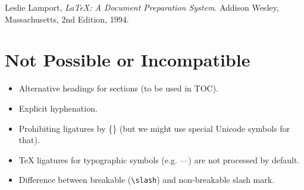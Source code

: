 \documentclass[10pt]{article}
\begin{document}



\begin{thebibliography}{9}

 Leslie Lamport, \emph{\LaTeX: A Document Preparation System}.
Addison Wesley, Massachusetts, 2nd Edition, 1994.

\end{thebibliography}

\hrulefill

\section{Not Possible or Incompatible}

\begin{itemize}

\item Alternative headings for sections (to be used in TOC).

\item Explicit hyphenation.

\item Prohibiting ligatures by \{\} (but we might use special Unicode symbols
for that).

\item \TeX{} ligatures for typographic symbols (e.g. ---) are not processed
by default.

\item Difference between breakable (\texttt{\textbackslash{}slash}) and
non-breakable slash mark.

\end{itemize}
\end{document}
